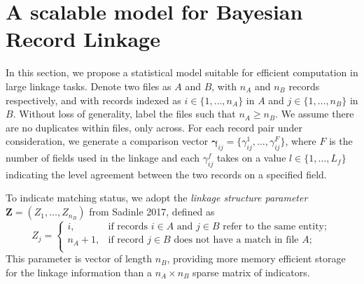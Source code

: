 \documentclass[12pt,letterpaper]{article}
\newcommand{\1}[1]{\mathbb{I}\!\left[#1\right]} %
\begin{document}

\section{A scalable model for Bayesian Record Linkage}
\label{sec:model}

In this section, we propose a statistical model suitable for efficient computation in large linkage tasks. Denote two files as \(A\) and \(B\), with \(n_A\) and \(n_B\) records
respectively, and with records indexed as \(i \in \{1, \ldots, n_A\}\)
in \(A\) and \(j \in \{1, \ldots, n_B\}\) in \(B\). Without loss of
generality, label the files such that \(n_A \geq n_B\). We assume there
are no duplicates within files, only across. For each record pair under
consideration, we generate a comparison vector
\(\boldsymbol{\gamma}_{ij} = \{\gamma_{ij}^1, \ldots, \gamma_{ij}^F\}\),
where \(F\) is the number of fields used in the linkage and each
\(\gamma_{ij}^f\) takes on a value \(l \in \{1, \ldots, L_f\}\)
indicating the level agreement between the two records on a specified
field.

To indicate matching status, we adopt the \emph{linkage structure
	parameter} \(\mathbf{Z} = (Z_1, \ldots, Z_{n_B})\) from Sadinle 2017,
defined as \[Z_j=\begin{cases} 
	i,  & \text{if records } i\in A \text{ and } j\in B \text{ refer to the same entity}; \\
	n_A + 1,  & \text{if record } j\in B \text{ does not have a match in file } A; \\
\end{cases}\] This parameter is vector of length $n_B$, providing more memory efficient storage for the
linkage information than a \(n_A \times n_B\) sparse matrix of
indicators.
\end{document}
